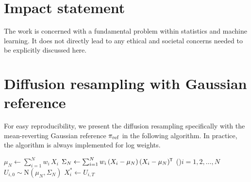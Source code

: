 \documentclass{article}
\begin{document}
\section*{Impact statement}
The work is concerned with a fundamental problem within statistics and machine learning. 
It does not directly lead to any ethical and societal concerns needed to be explicitly discussed here.





\newpage
\appendix
\onecolumn

\section{Diffusion resampling with Gaussian reference}
\label{app:diffres-gaussian}
For easy reproducibility, we present the diffusion resampling specifically with the mean-reverting Gaussian reference $\pi_{\mathrm{ref}}$ in the following algorithm. 
In practice, the algorithm is always implemented for log weights. 

\begin{algorithm2e}[]
    \SetAlgoLined
    \DontPrintSemicolon
    $\mu_N \gets \sum_{i=1}^N w_i \, X_i$\;
    $\Sigma_N \gets \sum_{i=1}^N w_i \, (X_i - \mu_N) \, (X_i - \mu_N)^{\mkern-1.5mu\mathsf{T}}$
    \For(){$i=1,2,\ldots, N$}{%
        $U_{i, 0} \sim \mathrm{N}(\mu_N, \Sigma_N)$\;
        $X^*_i \gets U_{i, T}$
    }
    \caption{Diffusion resampling \texttt{diffres} with Gaussian reference}
    \label{app:alg-diffres-normal}
\end{algorithm2e}
\end{document}
